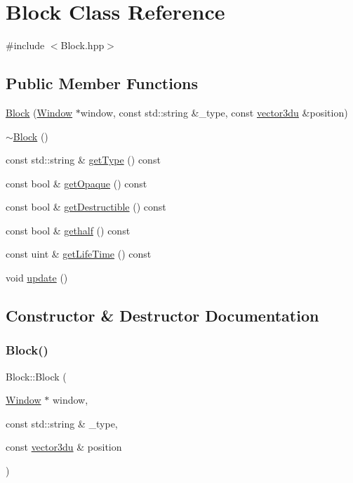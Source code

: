 \hypertarget{class_block}{}\section{Block Class Reference}
\label{class_block}


{\ttfamily \#include $<$Block.\+hpp$>$}

\subsection*{Public Member Functions}
\begin{DoxyCompactItemize}
\item 
\mbox{\hyperlink{class_block_aa76e2e3f0c08da0fe0decb5f47cbf43f}{Block}} (\mbox{\hyperlink{class_window}{Window}} $\ast$window, const std\+::string \&\+\_\+type, const \mbox{\hyperlink{_utility_8hpp_ac675fa2b6c79d0be47ae76e5d0ce38a8}{vector3du}} \&position)
\item 
\mbox{\hyperlink{class_block_a19d1bd0e1cef6a865ed2745a2e648405}{$\sim$\+Block}} ()
\item 
const std\+::string \& \mbox{\hyperlink{class_block_a5f2895baf07a0bb6f0c7c391b98dd9e4}{get\+Type}} () const
\item 
const bool \& \mbox{\hyperlink{class_block_a1023c8ec2f327f522fd47061c0cda6e1}{get\+Opaque}} () const
\item 
const bool \& \mbox{\hyperlink{class_block_ac0372fc210b766b6d5927210d7a79dd7}{get\+Destructible}} () const
\item 
const bool \& \mbox{\hyperlink{class_block_a99b2ae99cf45e39e3a41974b8f1e1673}{gethalf}} () const
\item 
const uint \& \mbox{\hyperlink{class_block_a5a18d5cda3145dccef9aab2a73f91bdb}{get\+Life\+Time}} () const
\item 
void \mbox{\hyperlink{class_block_a10e17f44df4d273c16190732197578f2}{update}} ()
\end{DoxyCompactItemize}


\subsection{Constructor \& Destructor Documentation}
\mbox{\label{class_block_aa76e2e3f0c08da0fe0decb5f47cbf43f}} 
\subsubsection{\texorpdfstring{Block()}{Block()}}
{\footnotesize\ttfamily Block\+::\+Block (\begin{DoxyParamCaption}\item[{\mbox{\hyperlink{class_window}{Window}} $\ast$}]{window,  }\item[{const std\+::string \&}]{\+\_\+type,  }\item[{const \mbox{\hyperlink{_utility_8hpp_ac675fa2b6c79d0be47ae76e5d0ce38a8}{vector3du}} \&}]{position }\end{DoxyParamCaption})}

